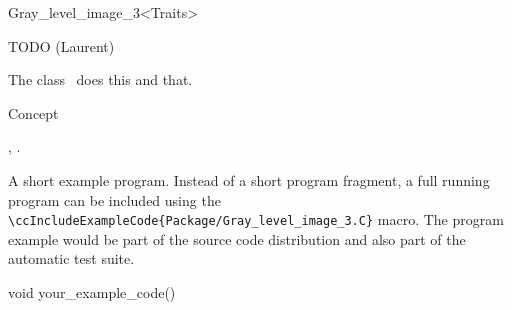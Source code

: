 

\begin{ccRefClass}{Gray_level_image_3<Traits>}  %


\ccDefinition
  
TODO (Laurent)

The class \ccRefName\ does this and that.


\ccIsModel

Concept

\ccTypes


\ccCreation
{}  %


\ccOperations


\ccSeeAlso

,
.

\ccExample

A short example program.
Instead of a short program fragment, a full running program can be
included using the 
\verb|\ccIncludeExampleCode{Package/Gray_level_image_3.C}| 
macro. The program example would be part of the source code distribution and
also part of the automatic test suite.

\begin{ccExampleCode}
void your_example_code() {
}
\end{ccExampleCode}


\end{ccRefClass}


